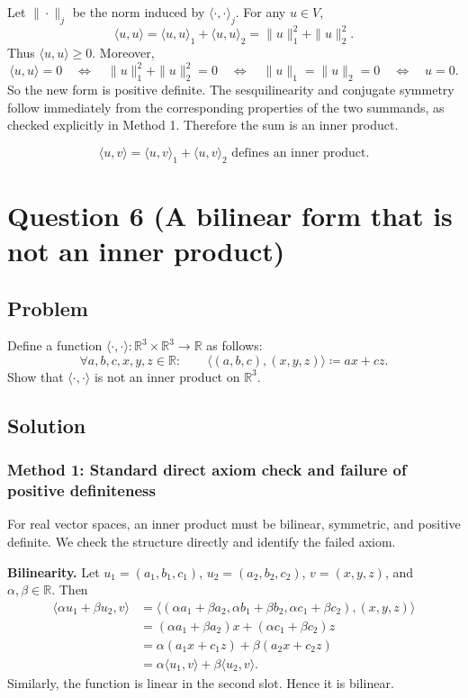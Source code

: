 \documentclass[12pt]{article}
\newcommand{\df}{\coloneqq}
\newcommand{\R}{\mathbb{R}}
\begin{document}
Let $\|\cdot\|_j$ be the norm induced by $\langle\cdot,\cdot\rangle_j$. For any $u\in V$,
\[
\langle u,u\rangle=\langle u,u\rangle_1+\langle u,u\rangle_2=\|u\|_1^2+\|u\|_2^2.
\]
Thus $\langle u,u\rangle\ge 0$. Moreover,
\[
\langle u,u\rangle=0
\quad\Longleftrightarrow\quad
\|u\|_1^2+\|u\|_2^2=0
\quad\Longleftrightarrow\quad
\|u\|_1=\|u\|_2=0
\quad\Longleftrightarrow\quad
u=0.
\]
So the new form is positive definite. The sesquilinearity and conjugate symmetry follow immediately from the corresponding properties of the two summands, as checked explicitly in Method 1. Therefore the sum is an inner product.

\[
\boxed{\,\langle u,v\rangle=\langle u,v\rangle_1+\langle u,v\rangle_2\text{ defines an inner product.}\,}
\]

\newpage
\section{Question 6 (A bilinear form that is not an inner product)}
\subsection{Problem}
Define a function $\langle\cdot,\cdot\rangle : \R^3\times \R^3\to \R$ as follows:
\[
\forall a,b,c,x,y,z\in \R:\qquad
\langle (a,b,c),(x,y,z)\rangle \df ax+cz.
\]
Show that $\langle\cdot,\cdot\rangle$ is not an inner product on $\R^3$.

\newpage
\subsection{Solution}

\subsubsection{Method 1: Standard direct axiom check and failure of positive definiteness}
For real vector spaces, an inner product must be bilinear, symmetric, and positive definite. We check the structure directly and identify the failed axiom.

\medskip
\noindent\textbf{Bilinearity.}
Let $u_1=(a_1,b_1,c_1)$, $u_2=(a_2,b_2,c_2)$, $v=(x,y,z)$, and $\alpha,\beta\in\R$. Then
\begin{align*}
\langle \alpha u_1+\beta u_2,v\rangle
&=\langle (\alpha a_1+\beta a_2,\alpha b_1+\beta b_2,\alpha c_1+\beta c_2),(x,y,z)\rangle\\
&=(\alpha a_1+\beta a_2)x+(\alpha c_1+\beta c_2)z\\
&=\alpha(a_1x+c_1z)+\beta(a_2x+c_2z)\\
&=\alpha\langle u_1,v\rangle+
\beta\langle u_2,v\rangle.
\end{align*}
Similarly, the function is linear in the second slot. Hence it is bilinear.
\end{document}
